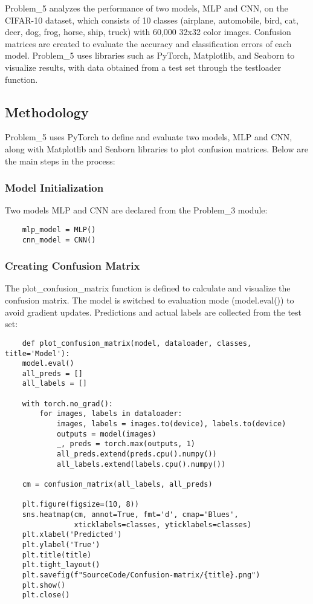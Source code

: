 \documentclass[12pt]{article}
\begin{document}
Problem\_5 analyzes the performance of two models, MLP and CNN, on the CIFAR-10 
dataset, which consists of 10 classes (airplane, automobile, bird, cat, deer, dog, 
frog, horse, ship, truck) with 60,000 32x32 color images. Confusion matrices are 
created to evaluate the accuracy and classification errors of each model. Problem\_5 
uses libraries such as PyTorch, Matplotlib, and Seaborn to visualize results, with 
data obtained from a test set through the testloader function.

\subsection{Methodology}

Problem\_5 uses PyTorch to define and evaluate two models, MLP and CNN, along with 
Matplotlib and Seaborn libraries to plot confusion matrices. Below are the main 
steps in the process:

\subsubsection{Model Initialization}

Two models MLP and CNN are declared from the Problem\_3 module:

\begin{verbatim}
    mlp_model = MLP()
    cnn_model = CNN()
\end{verbatim}

\subsubsection{Creating Confusion Matrix}

The plot\_confusion\_matrix function is defined to calculate and visualize the 
confusion matrix. The model is switched to evaluation mode (model.eval()) to avoid 
gradient updates. Predictions and actual labels are collected from the test set:

\begin{verbatim}
    def plot_confusion_matrix(model, dataloader, classes, title='Model'):
    model.eval()
    all_preds = []
    all_labels = []
    
    with torch.no_grad():
        for images, labels in dataloader:
            images, labels = images.to(device), labels.to(device)
            outputs = model(images)
            _, preds = torch.max(outputs, 1)
            all_preds.extend(preds.cpu().numpy())
            all_labels.extend(labels.cpu().numpy())
    
    cm = confusion_matrix(all_labels, all_preds)
    
    plt.figure(figsize=(10, 8))
    sns.heatmap(cm, annot=True, fmt='d', cmap='Blues', 
                xticklabels=classes, yticklabels=classes)
    plt.xlabel('Predicted')
    plt.ylabel('True')
    plt.title(title)
    plt.tight_layout()
    plt.savefig(f"SourceCode/Confusion-matrix/{title}.png")
    plt.show()
    plt.close()
\end{verbatim}
\end{document}
